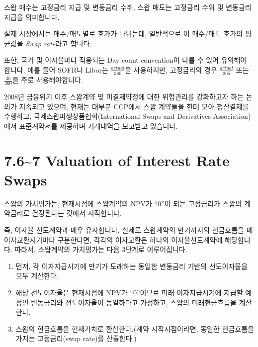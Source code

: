 \documentclass[
  letterpaper,
  DIV=11,
  numbers=noendperiod]{scrreprt}
\providecommand{\tightlist}{%
  \setlength{\itemsep}{0pt}\setlength{\parskip}{0pt}}\usepackage{longtable,booktabs,array}
\begin{document}
\begin{tcolorbox}[enhanced jigsaw, toprule=.15mm, breakable, left=2mm, leftrule=.75mm, opacitybacktitle=0.6, coltitle=black, rightrule=.15mm, colback=white, titlerule=0mm, bottomtitle=1mm, colframe=quarto-callout-tip-color-frame, title=\textcolor{quarto-callout-tip-color}{\faLightbulb}\hspace{0.5em}{The organization of swap trading}, toptitle=1mm, arc=.35mm, colbacktitle=quarto-callout-tip-color!10!white, opacityback=0, bottomrule=.15mm]

스왑 매수는 고정금리 지급 및 변동금리 수취, 스왑 매도는 고정금리 수위 및
변동금리 지급을 의미합니다.

실제 시장에서는 매수/매도별로 호가가 나뉘는데, 일반적으로 이 매수/매도
호가의 평균값을 \emph{Swap rate}라고 합니다.

또한, 국가 및 이자율마다 적용되는 Day count convention이 다를 수 있어
유의해야 합니다. 예를 들어 SOFR나 Libor는 \(\frac{actual}{360}\)을
사용하지만, 고정금리의 경우 \(\frac{actual}{365}\) 또는
\(\frac{30}{360}\)을 주로 사용해야합니다.

2008년 금융위기 이후 스왑계약 및 미결제약정에 대한 위험관리를 강화하고자
하는 논의가 지속되고 있으며, 현재는 대부분 CCP에서 스왑 계약들을 한데
모아 청산결제를 수행하고, 국제스왑파생상품협회(International Swaps and
Derivatives Association)에서 표준계약서를 제공하며 거래내역을 보고받고
있습니다.

\end{tcolorbox}

\section*{7.6\textasciitilde7 Valuation of Interest Rate
Swaps}\label{valuation-of-interest-rate-swaps}


스왑의 가치평가는, 현재시점에 스왑계약의 NPV가 ``0''이 되는 고정금리가
스왑의 계약금리로 결정된다는 것에서 시작합니다.

즉, 이자율 선도계약과 매우 유사합니다. 실제로 스왑계약의 만기까지의
현금흐름을 매 이자교환시기마다 구분한다면, 각각의 이자교환은 하나의
이자율선도계약에 해당합니다. 따라서, 스왑계약의 가치평가는 다음 3단계로
이루어집니다.

\begin{enumerate}
\def\labelenumi{(\arabic{enumi})}
\tightlist
\item
  먼저, 각 이자지급시기에 만기가 도래하는 동일한 변동금리 기반의
  선도이자율을 모두 계산한다.
\item
  해당 선도이자율은 현재시점에 NPV가 ``0''이므로 미래 이자지급시기에
  지급할 예정인 변동금리와 선도이자율이 동일하다고 가정하고, 스왑의
  미래현금흐름을 계산한다.
\item
  스왑의 현금흐름을 현재가치로 환산한다.(계약 시작시점이라면, 동일한
  현금흐름을 가지는 고정금리(swap rate)를 산출한다.)
\end{enumerate}
\end{document}
